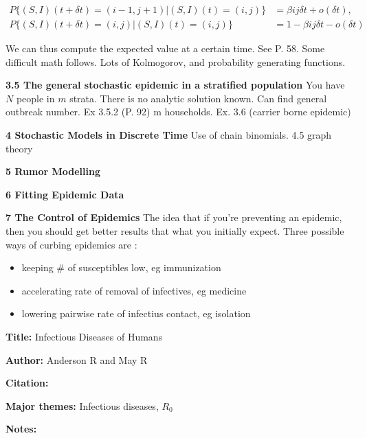 \message{ !name(refs.tex)}\documentclass{article}
\begin{document}
\begin{align*}
P\{(S, I) (t + \delta t) = (i -1, j+1) | (S, I)(t)=(i,j) \} &= \beta i j \delta t + o(\delta t),\\
P\{ (S,I)(t + \delta t) = (i,j)|(S,I)(t)=(i,j) \} &= 1 - \beta ij \delta t - o(\delta t)
\end{align*}

We can thus compute the expected value at a certain time.  See P. 58.  Some difficult math follows.  Lots of Kolmogorov, and probability generating functions.

\textbf{3.5 The general stochastic epidemic in a stratified population}
You have $N$ people in $m$ strata.  There is no analytic solution known.  Can find general outbreak number.  Ex 3.5.2 (P. 92) m households.  Ex. 3.6 (carrier borne epidemic)

\textbf{4 Stochastic Models in Discrete Time}  Use of chain binomials.  4.5 graph theory

\textbf{5 Rumor Modelling}

\textbf{6 Fitting Epidemic Data}

\textbf{7 The Control of Epidemics}
The idea that if you're preventing an epidemic, then you should get better results that what you initially expect.  Three possible ways of curbing epidemics are :
\begin{itemize}
\item keeping \# of susceptibles low, eg immunization
\item accelerating rate of removal of infectives, eg medicine
\item lowering pairwise rate of infectius contact, eg isolation
\end{itemize}


\textbf{Title:} Infectious Diseases of Humans

\textbf{Author:}  Anderson R and May R

\textbf{Citation:} \cite{anderson1992}

\textbf{Major themes:}  Infectious diseases, $R_0$

\textbf{Notes:}  
\end{document}

